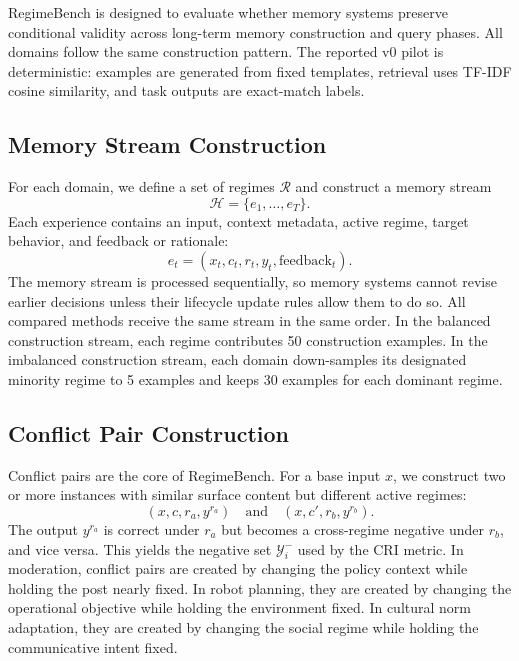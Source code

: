 \documentclass{article} %
\begin{document}
RegimeBench is designed to evaluate whether memory systems preserve conditional validity across long-term memory construction and query phases.
All domains follow the same construction pattern.
The reported v0 pilot is deterministic: examples are generated from fixed templates, retrieval uses TF-IDF cosine similarity, and task outputs are exact-match labels.

\subsection{Memory Stream Construction}

For each domain, we define a set of regimes $\mathcal{R}$ and construct a memory stream
\begin{equation}
    \mathcal{H} = \{e_1,\ldots,e_T\}.
\end{equation}
Each experience contains an input, context metadata, active regime, target behavior, and feedback or rationale:
\begin{equation}
    e_t=(x_t,c_t,r_t,y_t,\mathrm{feedback}_t).
\end{equation}
The memory stream is processed sequentially, so memory systems cannot revise earlier decisions unless their lifecycle update rules allow them to do so.
All compared methods receive the same stream in the same order.
In the balanced construction stream, each regime contributes 50 construction examples.
In the imbalanced construction stream, each domain down-samples its designated minority regime to 5 examples and keeps 30 examples for each dominant regime.

\subsection{Conflict Pair Construction}

Conflict pairs are the core of RegimeBench.
For a base input $x$, we construct two or more instances with similar surface content but different active regimes:
\begin{equation}
    (x,c,r_a,y^{r_a})
    \quad \text{and} \quad
    (x,c',r_b,y^{r_b}).
\end{equation}
The output $y^{r_a}$ is correct under $r_a$ but becomes a cross-regime negative under $r_b$, and vice versa.
This yields the negative set $\mathcal{Y}_i^{-}$ used by the CRI metric.
In moderation, conflict pairs are created by changing the policy context while holding the post nearly fixed.
In robot planning, they are created by changing the operational objective while holding the environment fixed.
In cultural norm adaptation, they are created by changing the social regime while holding the communicative intent fixed.
\end{document}
